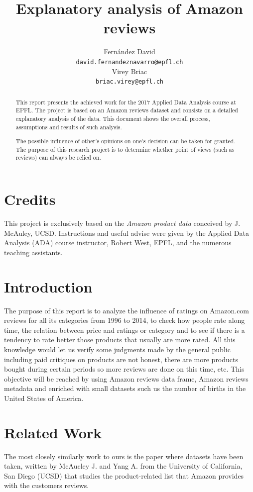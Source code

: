 \documentclass[11pt]{article}
\title{Explanatory analysis of Amazon reviews}
\author{Fern\'andez David\\
  {\tt david.fernandeznavarro@epfl.ch} \\\And
  Virey Briac\\
  {\tt briac.virey@epfl.ch} \\}
\date{}
\begin{document}
\maketitle
\begin{abstract}

This report presents the achieved work for the 2017 Applied Data Analysis course at EPFL. The project is based on an Amazon reviews dataset and consists on a detailed explanatory analysis of the data. This document shows the overall process, assumptions and results of such analysis.

The possible influence of other's opinions on one's decision can be taken for granted. The purpose of this research project is to determine whether point of views (such as reviews) can always be relied on.

 
\end{abstract}

\section{Credits}

This project is exclusively based on the {\em Amazon product data} conceived by J. McAuley, UCSD. Instructions and useful advise were given by the Applied Data Analysis (ADA) course instructor, Robert West, EPFL, and the numerous teaching assistants.

\section{Introduction}
The purpose of this report is to analyze the influence of ratings on Amazon.com reviews for all its categories from 1996 to 2014, to check how people rate along time, the relation between price and ratings or category and to see if there is a tendency to rate better those products that usually are more rated. All this knowledge would let us verify some judgments made by the general public including paid critiques on products are not honest, there are more products bought during certain periods so more reviews are done on this time, etc.
This objective will be reached by using Amazon reviews data frame,  Amazon reviews metadata and enriched with small datasets such us the number of births in the United States of America.


\section{Related Work}
The most closely similarly work to ours is the paper where datasets have been taken, written by McAucley J. and Yang A. from  the University of California, San Diego (UCSD) that studies the product-related list that Amazon provides with the customers reviews.
\end{document}
